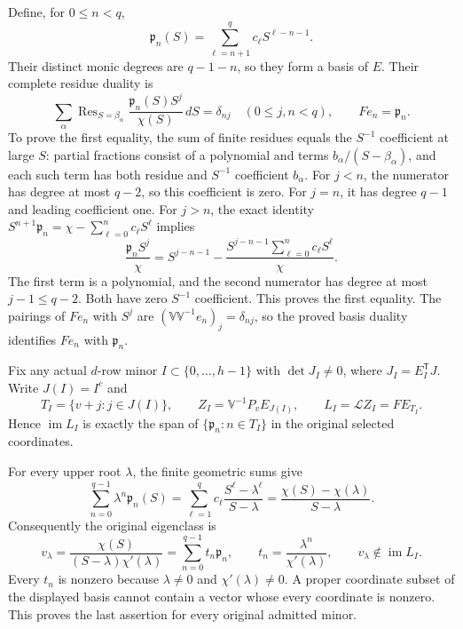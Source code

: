 \documentclass[11pt,a4paper]{article}
\begin{document}
Define, for $0\leq n<q$,
\begin{equation}\tag{NCB6}\label{ncb:pn}
\mathfrak p_n(S)=\sum_{\ell=n+1}^{q}c_\ell S^{\ell-n-1}.
\end{equation}
Their distinct monic degrees are $q-1-n$, so they form a basis of $E$.
Their complete residue duality is
\begin{equation}\tag{NCB7}\label{ncb:duality}
\sum_\alpha\operatorname{Res}_{S=\beta_\alpha}
\frac{\mathfrak p_n(S)S^j}{\chi(S)}\,dS=\delta_{nj}
\quad(0\leq j,n<q),\qquad Fe_n=\mathfrak p_n .
\end{equation}
To prove the first equality, the sum of finite residues equals the
$S^{-1}$ coefficient at large $S$: partial fractions consist of a
polynomial and terms $b_\alpha/(S-\beta_\alpha)$, and each such term
has both residue and $S^{-1}$ coefficient $b_\alpha$.
For $j<n$, the numerator has degree at most $q-2$, so this coefficient
is zero. For $j=n$, it has degree $q-1$ and leading coefficient one.
For $j>n$, the exact identity
$S^{n+1}\mathfrak p_n=\chi-\sum_{\ell=0}^{n}c_\ell S^\ell$
implies
\[
\frac{\mathfrak p_nS^j}{\chi}
=S^{j-n-1}
-\frac{S^{j-n-1}\sum_{\ell=0}^{n}c_\ell S^\ell}{\chi}.
\]
The first term is a polynomial, and the second numerator has degree
at most $j-1\leq q-2$. Both have zero $S^{-1}$ coefficient.
This proves the first equality. The pairings of $Fe_n$ with $S^j$
are $(\mathbb V\mathbb V^{-1}e_n)_j=\delta_{nj}$, so the proved
basis duality identifies $Fe_n$ with $\mathfrak p_n$.

Fix any actual $d$-row minor
$I\subset\{0,\ldots,h-1\}$ with $\det J_I\ne0$,
where $J_I=E_I^{\mathsf T}J$. Write $J(I)=I^c$ and
\begin{equation}\tag{NCB8}\label{ncb:native}
T_I=\{v+j:j\in J(I)\},\qquad
Z_I=\mathbb V^{-1}P_vE_{J(I)},\qquad
L_I=\mathcal LZ_I=FE_{T_I}.
\end{equation}
Hence $\operatorname{im}L_I$ is exactly the span of
$\{\mathfrak p_n:n\in T_I\}$ in the original selected coordinates.

For every upper root $\lambda$, the finite geometric sums give
\[
\sum_{n=0}^{q-1}\lambda^n\mathfrak p_n(S)
=\sum_{\ell=1}^{q}c_\ell
\frac{S^\ell-\lambda^\ell}{S-\lambda}
=\frac{\chi(S)-\chi(\lambda)}{S-\lambda}.
\]
Consequently the original eigenclass is
\begin{equation}\tag{NCB9}\label{ncb:eigenclass}
v_\lambda=\frac{\chi(S)}{(S-\lambda)\chi'(\lambda)}
=\sum_{n=0}^{q-1}t_n\mathfrak p_n,\qquad
t_n=\frac{\lambda^n}{\chi'(\lambda)},\qquad
v_\lambda\notin\operatorname{im}L_I.
\end{equation}
Every $t_n$ is nonzero because $\lambda\ne0$ and
$\chi'(\lambda)\ne0$. A proper coordinate subset of the displayed
basis cannot contain a vector whose every coordinate is nonzero.
This proves the last assertion for every original admitted minor.
\end{document}
